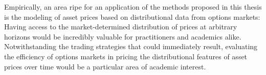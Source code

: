 Empirically, an area ripe for an application of the methods proposed
in this thesis is the modeling of asset prices based on distributional
data from options markets: Having access to the market-determined
distribution of prices at arbitrary horizons would be incredibly valuable
for practitioners and academics alike. Notwithstanding the trading
strategies that could immediately result, evaluating the efficiency
of options markets in pricing the distributional features of asset
prices over time would be a particular area of academic interest.
